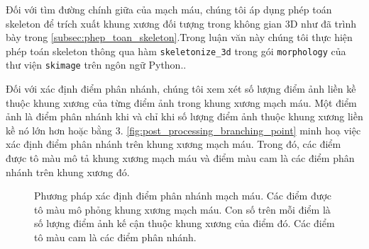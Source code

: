 	Đối với tìm đường chính giữa của mạch máu, chúng tôi áp dụng phép toán skeleton để trích xuất khung xương đối tượng trong không gian 3D như đã trình bày trong \autoref{subsec:phep_toan_skeleton}.\linebreak Trong luận văn này chúng tôi thực hiện phép toán skeleton thông qua hàm \verb/skeletonize_3d/ trong gói \verb/morphology/ của thư viện \verb/skimage/ trên ngôn ngữ Python..
	
	Đối với xác định điểm phân nhánh, chúng tôi xem xét số lượng điểm ảnh liền kề thuộc khung xương của từng điểm ảnh trong khung xương mạch máu. Một điểm ảnh là điểm phân nhánh khi và chỉ khi số lượng điểm ảnh thuộc khung xương liền kề nó lớn hơn hoặc bằng 3. \autoref{fig:post_processing_branching_point} minh hoạ việc xác định điểm phân nhánh trên khung xương mạch máu. Trong đó, các điểm được tô màu mô tả khung xương mạch máu và điểm màu cam là các điểm phân nhánh trên khung xương đó.
	\begin{figure}[h!]
		\centering
		
		\caption[Phương pháp xác định điểm phân nhánh mạch máu.]{Phương pháp xác định điểm phân nhánh mạch máu. Các điểm được tô màu mô phỏng khung xương mạch máu. Con số trên mỗi điểm là số lượng điểm ảnh kế cận thuộc khung xương của điểm đó. Các điểm tô màu cam là các điểm phân nhánh.}
		\label{fig:post_processing_branching_point}
	\end{figure}

